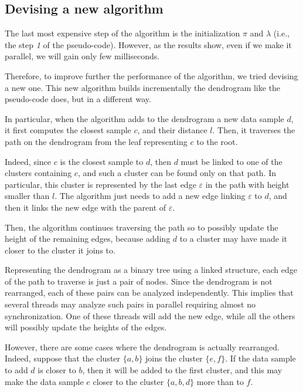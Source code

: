 \documentclass{article}
\begin{document}
\vspace{-10pt}

\hypertarget{failed-attempt}{
\subsection{Devising a new algorithm}
\label{failed-attempt}}

The last most expensive step of the algorithm is the initialization $\pi$ and $\lambda$ (i.e.,
the step \textit{1} of the pseudo-code). However, as the results show, even if we make it
parallel, we will gain only few milliseconds.

Therefore, to improve further the performance of the algorithm, we tried devising a new one. This
new algorithm builds incrementally the dendrogram like the pseudo-code does, but in a different way.

In particular, when the algorithm adds to the dendrogram a new data sample $d$, it first computes
the closest sample $c$, and their distance $l$. Then, it traverses the path on the dendrogram
from the leaf representing $c$ to the root.

Indeed, since $c$ is the closest sample to $d$, then $d$ must be linked to one of the clusters
containing $c$, and such a cluster can be found only on that path. In particular, this cluster
is represented by the last edge $\varepsilon$ in the path with height smaller than $l$. The
algorithm just needs to add a new edge linking $\varepsilon$ to $d$, and then it links the
new edge with the parent of $\varepsilon$.

Then, the algorithm continues traversing the path so to possibly update the height of the
remaining edges, because adding $d$ to a cluster may have made it closer to the cluster it
joins to.

Representing the dendrogram as a binary tree using a linked structure, each edge of the path to
traverse is just a pair of nodes.
Since the dendrogram is not rearranged, each of these pairs can be analyzed independently.
This implies that several threads may analyze such pairs in parallel requiring almost no
synchronization. One of these threads will add the new edge, while all the others will possibly
update the heights of the edges.

However, there are some cases where the dendrogram is actually rearranged. Indeed, suppose that
the cluster $\{a, b\}$ joins the cluster $\{e, f\}$. If the data sample
to add $d$ is closer to $b$, then it will be added to the first cluster, and this may make the
data sample $e$ closer to the cluster $\{a, b, d\}$ more than to $f$.
\end{document}
